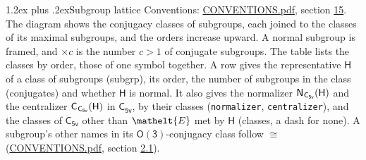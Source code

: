 \documentclass[10pt,a4paper]{article}
\makeatletter
\renewcommand\section{\@startsection{section}{1}{\z@}{-3ex plus -1ex minus -.2ex}%
  {1.2ex plus .2ex}{\normalfont\large\sffamily\bfseries\color{parttitle}}}
\numberwithin{equation}{section}
\newcommand{\eltfont}[1]{{\let\sigma\eltsigma\mathelt{#1}}}
\newcommand{\grp}[1]{\mathsf{#1}}
\newcommand{\cls}[1]{\eltfont{#1}}
\newcommand{\samecls}{\cong}
\newcommand{\nconj}[1]{{\scriptsize$\times#1$}}
\newcommand{\hairsp}{\mkern1mu}
\makeatother
\begin{document}
\section{Subgroup lattice}\label{s:subgroups}
Conventions: \href{../../CONVENTIONS.pdf}{CONVENTIONS.pdf}, section \href{../../CONVENTIONS.pdf\#conv.15}{15}.
The diagram shows the conjugacy classes of subgroups, each joined to the classes of its maximal subgroups, and the orders increase upward. A normal subgroup is framed, and ${\times}c$ is the number $c > 1$ of conjugate subgroups. The table lists the classes by order, those of one symbol together. \label{n:group.H}\label{n:head.subgroup}\label{n:head.order}\label{n:head.conjugates}\label{n:head.normal}A row gives the representative $\grp{H}$ of a class of subgroups (subgrp), its order, the number of subgroups in the class (conjugates) and whether $\grp{H}$ is normal. \label{n:group.normalizer}\label{n:group.centralizer}\label{n:head.classes}It also gives the normalizer $\grp{N}_{\hairsp \grp{C_{5v}}}(\grp{H})$ and the centralizer $\grp{C}_{\hairsp \grp{C_{5v}}}(\grp{H})$ in $\grp{C_{5v}}$, by their classes (\texttt{normalizer}, \texttt{centralizer}), and the classes of $\grp{C_{5v}}$ other than $\cls{E}$ met by $\grp{H}$ (classes, a dash for none). A subgroup's other names in its \href{O3.pdf}{$\grp{O(3)}$}-conjugacy class follow $\samecls$ (\href{../../CONVENTIONS.pdf}{CONVENTIONS.pdf}, section \href{../../CONVENTIONS.pdf\#conv.2.1}{2.1}).
\begin{center}
\end{center}
\end{document}
